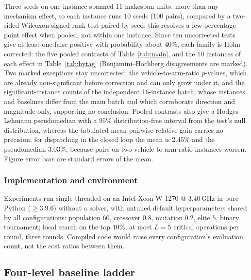 \documentclass[preprint,review,12pt,authoryear,doubleblind]{elsarticle}
\newcommand{\NCases}{10}
\newcommand{\NSeeds}{10}
\newcommand{\NPairs}{100}
\newcommand{\GainProbeLoop}{2.45\%}      %
\newcommand{\HLProbeLoop}{3.03\%}
\newcommand{\MatrixCells}{16}
\begin{document}
Three seeds on one instance spanned $11$ makespan units, more than any mechanism effect, so each instance runs $\NSeeds$ seeds ($\NPairs$ pairs), compared by a two-sided Wilcoxon signed-rank test paired by seed; this resolves a few-percentage-point effect when pooled, not within one instance.
Since ten uncorrected tests give at least one false positive with probability about $40\%$, each family is Holm-corrected: the five pooled contrasts of Table~\ref{tab:main}, and the $\NCases$ instances of each effect in Table~\ref{tab:bytag} (Benjamini--Hochberg disagreements are marked).
Two marked exceptions stay uncorrected: the vehicle-to-arm-ratio $p$-values, which are already non-significant before correction and can only grow under it, and the significant-instance counts of the independent \MatrixCells{}-instance batch, whose instances and baselines differ from the main batch and which corroborate direction and magnitude only, supporting no conclusion.
Pooled contrasts also give a Hodges--Lehmann pseudomedian with a $95\%$ distribution-free interval from the test's null distribution, whereas the tabulated mean pairwise relative gain carries no precision; for dispatching in the closed loop the mean is \GainProbeLoop{} and the pseudomedian \HLProbeLoop{}, because pairs on two vehicle-to-arm-ratio instances worsen.
Figure error bars are standard errors of the mean.

\subsubsection{Implementation and environment}
\label{sec:impl}
Experiments run single-threaded on an Intel Xeon W-1270 @ $3.40$\,GHz in pure Python ($\ge 3.9.6$) without a solver, with untuned default hyperparameters shared by all configurations: population $60$, crossover $0.8$, mutation $0.2$, elite $5$, binary tournament; local search on the top $10\%$, at most $L=5$ critical operations per round, three rounds.
Compiled code would raise every configuration's evaluation count, not the cost ratios between them.

\subsection{Four-level baseline ladder}
\label{sec:arms}
\end{document}
